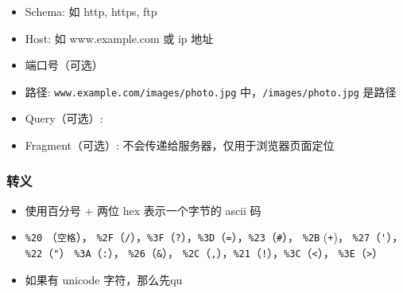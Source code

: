 

\begin{issues}
\issueDraft
\end{issues}

\begin{itemize}
\item Schema: 如 http, https, ftp
\item Host: 如 www.example.com 或 ip 地址
\item 端口号（可选）
\item 路径: \verb`www.example.com/images/photo.jpg` 中，\verb`/images/photo.jpg` 是路径
\item Query（可选）:
\item Fragment（可选）: 不会传递给服务器，仅用于浏览器页面定位
\end{itemize}

\subsubsection{转义}
\begin{itemize}
\item 使用百分号 + 两位 hex 表示一个字节的 ascii 码
\item \verb`%20` （\verb`空格`）， \verb`%2F`（\verb`/`），\verb`%3F`（\verb`?`），\verb`%3D`（\verb`=`），\verb`%23`（\verb`#`）， \verb`%2B` (\verb`+`)， \verb`%27`（\verb`'`），\verb`%22`（\verb`"`） \verb`%3A`（\verb`:`）， \verb`%26`（\verb`&`）， \verb`%2C`（\verb`,`），\verb`%21`（\verb`!`），\verb`%3C`（\verb`<`）， \verb`%3E`（\verb`>`）
\item 如果有 unicode 字符，那么先qu
\end{itemize}
